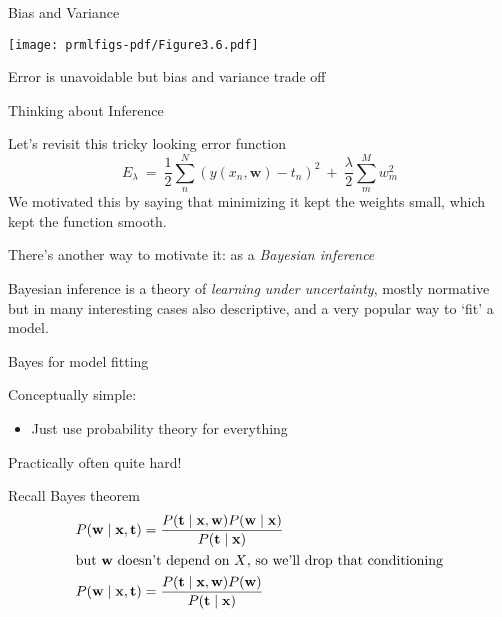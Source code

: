 \documentclass{hertieteaching}
\begin{document}
\begin{frame}{Bias and Variance}

\bigskip

\centerline{\texttt{[image: prmlfigs-pdf/Figure3.6.pdf]}}

\centerline{Error is unavoidable but bias and variance trade off}
\end{frame}



\begin{frame}{Thinking about Inference}

Let's revisit this tricky looking error function
$$
E_{\lambda} ~=~ \frac{1}{2}\sum^{N}_n (y(x_n, \textbf{w}) - t_n)^2 ~+~ \frac{\lambda}{2} \sum^{M}_m w_m^2
$$
We motivated this by saying that minimizing it kept the weights small, which kept the function smooth.

There's another way to motivate it: as a \textit{Bayesian inference}

\pause

Bayesian inference is a theory of \textit{learning under uncertainty}, mostly normative but in many interesting cases also descriptive, and a very popular way to `fit' a model.

\end{frame}

\begin{frame}{Bayes for model fitting}

Conceptually simple: 
\begin{itemize}
  \item Just use probability theory for everything
\end{itemize}
Practically often quite hard!

\pause

Recall Bayes theorem
\begin{align*}
P(\mathbf{w} \mid \mathbf{x}, \mathbf{t})  & = \frac{P(\mathbf{t} \mid \mathbf{x}, \mathbf{w})P(\mathbf{w}\mid \mathbf{x})}
          {P(\mathbf{t} \mid \mathbf{x})}\\
\intertext{but $\mathbf{w}$ doesn't depend on $X$, so we'll drop that conditioning}
P(\mathbf{w} \mid \mathbf{x}, \mathbf{t})  & = \frac{P(\mathbf{t} \mid \mathbf{x}, \mathbf{w})P(\mathbf{w})}
          {P(\mathbf{t} \mid \mathbf{x})}
\end{align*}

\end{frame}
\end{document}
